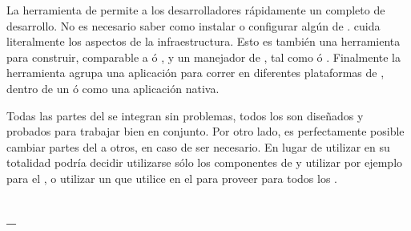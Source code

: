La herramienta \clitool de \meteorNAME permite a los desarrolladores rápidamente \setupCPT un \environmentPL completo de desarrollo. No es necesario saber como instalar o configurar algún \softwarePC de \serverAS. \meteorNAME cuida literalmente los aspectos de la infraestructura. Esto es también una herramienta para construir, comparable a \maketool ó \grunttoolNAME, y un manejador de \packageAS, tal como \apttool ó \npm. Finalmente la herramienta \clitool agrupa una aplicación para correr en diferentes plataformas de \clientsAS, dentro de un \browserINT \webINT ó como una aplicación \mobileINT nativa.

Todas las partes del \stackAS se integran sin problemas, todos los \packagesAS \coreAS son diseñados y probados para trabajar bien en conjunto. Por otro lado, es perfectamente posible cambiar partes del \stackAS a otros, en caso de ser necesario. En lugar de utilizar \meteorNAME en su totalidad podría decidir utilizarse sólo los componentes de \serverAS y utilizar por ejemplo \angularjsNAME para el \clientSideAS, o utilizar un \javabackend que utilice \meteorNAME en el \frontEndAS para proveer \updates \realTimeINT para todos los \clientsAS.

\subsection{\frameworkPC \isomorphicAS – \fullstackAS \javaScriptNAME}

